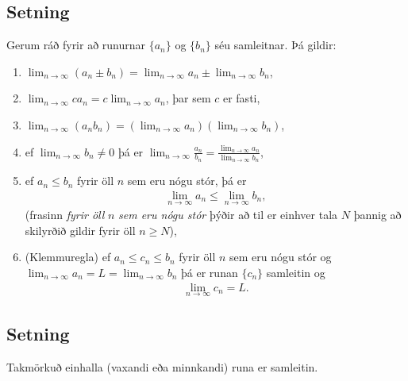 \documentclass[b5paper,11pt,icelandic]{sphinxmanual}
\begin{document}
\subsection{Setning}
\label{kafli09:id4}
Gerum ráð fyrir að runurnar \(\{a_n\}\) og \(\{b_n\}\) séu
samleitnar. Þá gildir:
\begin{enumerate}
\item {} 
\(\lim_{n\rightarrow\infty}(a_n\pm b_n)=
\lim_{n\rightarrow\infty}a_n\pm\lim_{n\rightarrow\infty}b_n\),

\item {} 
\(\lim_{n\rightarrow\infty}ca_n=
c\lim_{n\rightarrow\infty}a_n\), þar sem \(c\) er fasti,

\item {} 
\(\lim_{n\rightarrow\infty}(a_n b_n)=
(\lim_{n\rightarrow\infty}a_n)(\lim_{n\rightarrow\infty}b_n)\),

\item {} 
ef \(\lim_{n\rightarrow\infty}b_n\neq 0\) þá er
\(\lim_{n\rightarrow\infty}\frac{a_n}{b_n}=
\frac{\lim_{n\rightarrow\infty}a_n}{\lim_{n\rightarrow\infty}b_n}\),

\item {} 
ef \(a_n\leq b_n\) fyrir öll \(n\) sem eru nógu stór, þá
er
\begin{equation*}
\begin{split}\lim_{n\rightarrow\infty}a_n\leq\lim_{n\rightarrow\infty}b_n,\end{split}
\end{equation*}
(frasinn \emph{fyrir öll} \(n\) \emph{sem eru nógu stór} þýðir að til er
einhver tala \(N\) þannig að skilyrðið gildir fyrir öll
\(n\geq N\)),

\item {} 
(Klemmuregla) ef \(a_n\leq c_n\leq b_n\) fyrir öll \(n\)
sem eru nógu stór og
\(\lim_{n\rightarrow\infty}a_n=L=\lim_{n\rightarrow\infty}b_n\)
þá er runan \(\{c_n\}\) samleitin og
\begin{equation*}
\begin{split}\lim_{n\rightarrow\infty}c_n=L.\end{split}
\end{equation*}
\end{enumerate}


\subsection{Setning}
\label{kafli09:id5}
Takmörkuð einhalla (vaxandi eða minnkandi) runa er samleitin.
\end{document}

